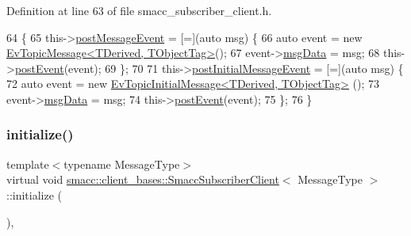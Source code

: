 Definition at line 63 of file smacc\+\_\+subscriber\+\_\+client.\+h.


\begin{DoxyCode}
64   \{
65     this->\hyperlink{classsmacc_1_1client__bases_1_1SmaccSubscriberClient_ad71ae0708e8a3ea321de985076d8b0ac}{postMessageEvent} = [=](\textcolor{keyword}{auto} msg) \{
66       \textcolor{keyword}{auto} \textcolor{keyword}{event} = \textcolor{keyword}{new} \hyperlink{structsmacc_1_1default__events_1_1EvTopicMessage}{EvTopicMessage<TDerived, TObjectTag>}();
67       \textcolor{keyword}{event}->\hyperlink{structsmacc_1_1default__events_1_1EvTopicMessage_a82384568b702a0c3a3dc2fbe7eeefea9}{msgData} = msg;
68       this->\hyperlink{classsmacc_1_1ISmaccClient_a21a79203cb44fc717d4d977c190327c6}{postEvent}(event);
69     \};
70 
71     this->\hyperlink{classsmacc_1_1client__bases_1_1SmaccSubscriberClient_ac184f4c0a6e924ceb9eecc71d6252106}{postInitialMessageEvent} = [=](\textcolor{keyword}{auto} msg) \{
72       \textcolor{keyword}{auto} \textcolor{keyword}{event} = \textcolor{keyword}{new} \hyperlink{structsmacc_1_1default__events_1_1EvTopicInitialMessage}{EvTopicInitialMessage<TDerived, TObjectTag>}
      ();
73       \textcolor{keyword}{event}->\hyperlink{structsmacc_1_1default__events_1_1EvTopicInitialMessage_a989c7cf4210c7750806b081bc73112cd}{msgData} = msg;
74       this->\hyperlink{classsmacc_1_1ISmaccClient_a21a79203cb44fc717d4d977c190327c6}{postEvent}(event);
75     \};
76   \}
\end{DoxyCode}
\mbox{\label{classsmacc_1_1client__bases_1_1SmaccSubscriberClient_af188f0f5e89de26a07e1f964cdd23a70}} 
\subsubsection{\texorpdfstring{initialize()}{initialize()}}
{\footnotesize\ttfamily template$<$typename Message\+Type$>$ \\
virtual void \hyperlink{classsmacc_1_1client__bases_1_1SmaccSubscriberClient}{smacc\+::client\+\_\+bases\+::\+Smacc\+Subscriber\+Client}$<$ Message\+Type $>$\+::initialize (\begin{DoxyParamCaption}{ }\end{DoxyParamCaption})\hspace{0.3cm}{\ttfamily [inline]}, {\ttfamily [virtual]}}



